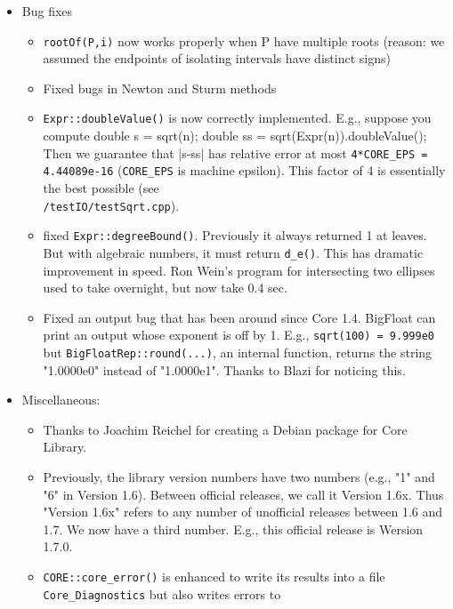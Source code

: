 \documentclass[12pt]{article}
\begin{document}
\begin{itemize}
   \item Bug fixes
        \begin{itemize}
          \item \texttt{rootOf(P,i)} now works properly when P have
	     multiple roots
            (reason: we assumed the endpoints of isolating intervals
            have distinct signs)
	  \item Fixed bugs in Newton and Sturm methods
          \item \texttt{Expr::doubleValue()} is now correctly implemented.
	    E.g., suppose you compute
	        double s = sqrt(n);
		double ss = sqrt(Expr(n)).doubleValue();
            Then we guarantee that |s-ss| has relative error at
	    most \texttt{4*CORE\_EPS = 4.44089e-16}
	    (\texttt{CORE\_EPS} is machine epsilon). 
	    This factor of 4 is essentially the best possible (see \\
	    \examplesdir\texttt{/testIO/testSqrt.cpp}).
	  \item fixed \texttt{Expr::degreeBound()}.  Previously it always 
	    returned 1 at
	    leaves.  But with algebraic numbers, it must return
	    \texttt{d\_e()}.
	    This has dramatic improvement in speed. Ron Wein's program for
	    intersecting two ellipses used to take overnight, but now take
	    0.4 sec.
	  \item Fixed an output bug that has been around since Core 1.4.
	    BigFloat can print an output whose exponent is off by 1.
	        E.g., \texttt{sqrt(100) = 9.999e0}
		but \texttt{BigFloatRep::round(...)},
		an internal function, returns the string "1.0000e0"
		instead of "1.0000e1".  Thanks to Blazi for noticing this.
        \end{itemize}
   \item Miscellaneous:
        \begin{itemize}
	  \item Thanks to Joachim Reichel for creating a Debian package
	    for Core Library.
          \item Previously, the library version numbers have two numbers
            (e.g., "1" and "6" in Version 1.6).  Between official releases,
	    we call it Version 1.6x.  Thus "Version 1.6x" refers to any
            number of unofficial releases between 1.6 and 1.7.
            We now have a third number.  E.g., this official release
            is Wersion 1.7.0.
          \item \texttt{CORE::core\_error()} is enhanced to write its results
	    into a file \texttt{Core\_Diagnostics} but also writes errors to

\end{itemize}
\end{itemize}
\end{document}

